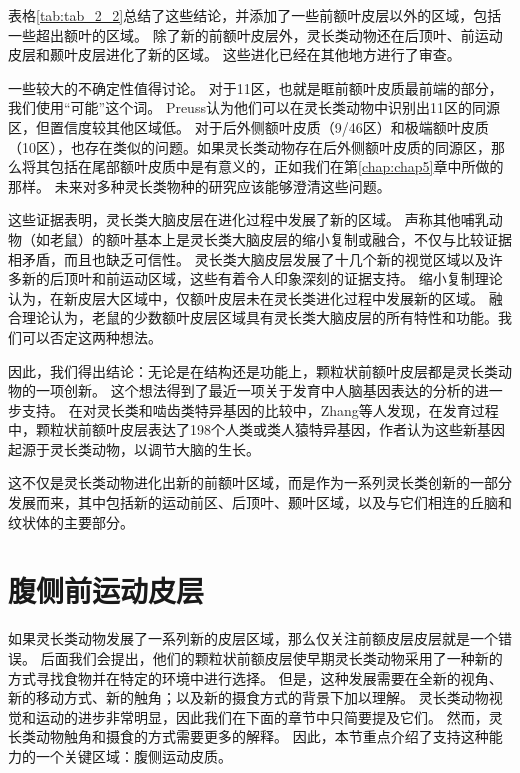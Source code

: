 表格\ref{tab:tab_2_2}总结了这些结论，并添加了一些前额叶皮层以外的区域，包括一些超出额叶的区域。
除了新的前额叶皮层外，灵长类动物还在后顶叶、前运动皮层和颞叶皮层进化了新的区域。
这些进化已经在其他地方进行了审查\cite{kaas2020evolution,preuss2007primate}。


一些较大的不确定性值得讨论。
对于11区，也就是眶前额叶皮质最前端的部分，我们使用“可能”这个词。
Preuss\cite{preuss1991myelo}认为他们可以在灵长类动物中识别出11区的同源区，但置信度较其他区域低。
对于后外侧额叶皮质（9/46区）和极端额叶皮质（10区），也存在类似的问题。如果灵长类动物存在后外侧额叶皮质的同源区，那么将其包括在尾部额叶皮质中是有意义的，正如我们在第\ref{chap:chap5}章中所做的那样。
未来对多种灵长类物种的研究应该能够澄清这些问题。


这些证据表明，灵长类大脑皮层在进化过程中发展了新的区域。
声称其他哺乳动物（如老鼠）的额叶基本上是灵长类大脑皮层的缩小复制或融合，不仅与比较证据相矛盾，而且也缺乏可信性。
灵长类大脑皮层发展了十几个新的视觉区域以及许多新的后顶叶和前运动区域，这些有着令人印象深刻的证据支持。
缩小复制理论认为，在新皮层大区域中，仅额叶皮层未在灵长类进化过程中发展新的区域。
融合理论认为，老鼠的少数额叶皮层区域具有灵长类大脑皮层的所有特性和功能。我们可以否定这两种想法。


因此，我们得出结论：无论是在结构还是功能上，颗粒状前额叶皮层都是灵长类动物的一项创新。
这个想法得到了最近一项关于发育中人脑基因表达的分析的进一步支持。
在对灵长类和啮齿类特异基因的比较中，Zhang等人\cite{zhang2011accelerated}发现，在发育过程中，颗粒状前额叶皮层表达了198个人类或类人猿特异基因，作者认为这些新基因起源于灵长类动物，以调节大脑的生长。


这不仅是灵长类动物进化出新的前额叶区域，而是作为一系列灵长类创新的一部分发展而来，其中包括新的运动前区、后顶叶、颞叶区域，以及与它们相连的丘脑和纹状体的主要部分\cite{preuss2007evolutionary,preuss2007primate}。



\section{腹侧前运动皮层}

如果灵长类动物发展了一系列新的皮层区域，那么仅关注前额皮层皮层就是一个错误。
后面我们会提出，他们的颗粒状前额皮层使早期灵长类动物采用了一种新的方式寻找食物并在特定的环境中进行选择。
但是，这种发展需要在全新的视角、新的移动方式、新的触角；以及新的摄食方式的背景下加以理解。
灵长类动物视觉和运动的进步非常明显，因此我们在下面的章节中只简要提及它们。
然而，灵长类动物触角和摄食的方式需要更多的解释。
因此，本节重点介绍了支持这种能力的一个关键区域：腹侧运动皮质。


